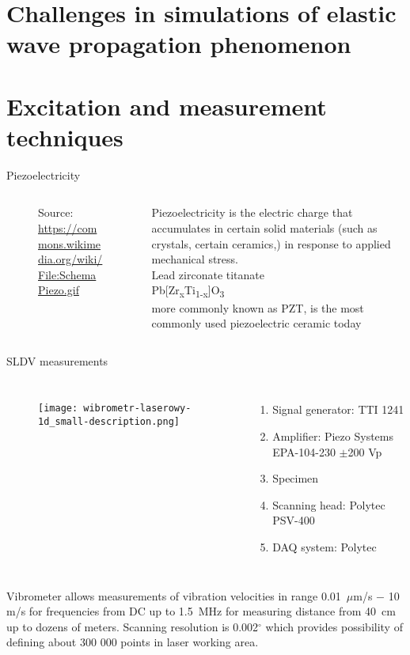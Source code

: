\documentclass[10pt,aspectratio=169,notes]{beamer} %
\begin{document}
\section{Challenges in simulations of elastic wave propagation phenomenon}
\section{Excitation and measurement techniques}
\begin{frame}{Piezoelectricity}
	\begin{columns}[T]
		\begin{column}{0.5\textwidth}
			\begin{figure}
				\caption{Source: \url{https://commons.wikimedia.org/wiki/File:SchemaPiezo.gif }}
			\end{figure}
		\end{column}
		\begin{column}{0.5\textwidth}
		Piezoelectricity is the electric charge that accumulates in certain solid materials (such as crystals, certain ceramics,) in response to applied mechanical stress.	\\
		Lead zirconate titanate\\
		Pb[Zr\textsubscript{x}Ti\textsubscript{1-x}]O\textsubscript{3} \\
		 more commonly known as PZT, is the most commonly used piezoelectric ceramic today
		\end{column}
	\end{columns}		
\end{frame}
\note{
}
\begin{frame}[t]{SLDV measurements}
	\begin{columns}[T]
		\begin{figure}
			\texttt{[image: wibrometr-laserowy-1d\_small-description.png]}
		\end{figure}
		\begin{enumerate}
			\item Signal generator: TTI 1241 
			\item Amplifier: Piezo Systems EPA-104-230 $\pm$200 Vp
			\item Specimen
			\item Scanning head: Polytec PSV-400
			\item DAQ system: Polytec
		\end{enumerate}
	\end{columns}
	{\small
		Vibrometer allows measurements of vibration velocities in range 0.01~$\mu$m/s $-$ 10 m/s for frequencies from DC up to 1.5~MHz for measuring distance from 40~cm up to dozens of meters. Scanning resolution is 0.002$^{\circ}$  which provides possibility of defining about 300 000 points in laser working area.}
\end{frame}
\end{document}
